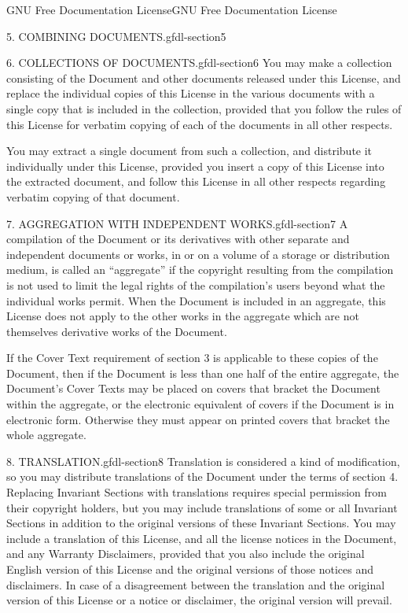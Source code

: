 \documentclass[10pt,]{book}
\numberwithin{equation}{section}
\begin{document}
\begin{appendixptx}{GNU Free Documentation License}{}{GNU Free Documentation License}{}{}
\begin{paragraphs}{5. COMBINING DOCUMENTS.}{gfdl-section5}
\end{paragraphs}%
\begin{paragraphs}{6. COLLECTIONS OF DOCUMENTS.}{gfdl-section6}%
\hypertarget{p-1352}{}%
You may make a collection consisting of the Document and other documents released under this License, and replace the individual copies of this License in the various documents with a single copy that is included in the collection, provided that you follow the rules of this License for verbatim copying of each of the documents in all other respects.%
\par
\hypertarget{p-1353}{}%
You may extract a single document from such a collection, and distribute it individually under this License, provided you insert a copy of this License into the extracted document, and follow this License in all other respects regarding verbatim copying of that document.%
\end{paragraphs}%
\begin{paragraphs}{7. AGGREGATION WITH INDEPENDENT WORKS.}{gfdl-section7}%
\hypertarget{p-1354}{}%
A compilation of the Document or its derivatives with other separate and independent documents or works, in or on a volume of a storage or distribution medium, is called an ``aggregate'' if the copyright resulting from the compilation is not used to limit the legal rights of the compilation's users beyond what the individual works permit. When the Document is included in an aggregate, this License does not apply to the other works in the aggregate which are not themselves derivative works of the Document.%
\par
\hypertarget{p-1355}{}%
If the Cover Text requirement of section 3 is applicable to these copies of the Document, then if the Document is less than one half of the entire aggregate, the Document's Cover Texts may be placed on covers that bracket the Document within the aggregate, or the electronic equivalent of covers if the Document is in electronic form. Otherwise they must appear on printed covers that bracket the whole aggregate.%
\end{paragraphs}%
\begin{paragraphs}{8. TRANSLATION.}{gfdl-section8}%
\hypertarget{p-1356}{}%
Translation is considered a kind of modification, so you may distribute translations of the Document under the terms of section 4. Replacing Invariant Sections with translations requires special permission from their copyright holders, but you may include translations of some or all Invariant Sections in addition to the original versions of these Invariant Sections. You may include a translation of this License, and all the license notices in the Document, and any Warranty Disclaimers, provided that you also include the original English version of this License and the original versions of those notices and disclaimers. In case of a disagreement between the translation and the original version of this License or a notice or disclaimer, the original version will prevail.%

\end{paragraphs}
\end{appendixptx}
\end{document}

